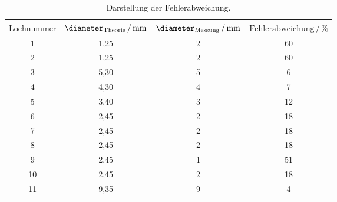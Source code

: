 \begin{table}[H]
  \centering
  \caption{Darstellung der Fehlerabweichung.}
  \label{tab:4}
  \begin{tabular}{c c c  c}
    \toprule
     $\text{Lochnummer}$ &
     $\diameter_{\text{Theorie}} \,/\, \si[per-mode=fraction]{\milli\meter}$ &
     $\diameter_{\text{Messung}} \,/\, \si[per-mode=fraction]{\milli\meter}$ &
     $\text{Fehlerabweichung} \,/\, \%$ \\
     \midrule
     1 & 1,25 & 2 &  60 \\
     2 & 1,25 & 2 &  60 \\
     3 & 5,30 & 5 &  6 \\
     4 & 4,30 & 4 &  7 \\
     5 & 3,40 & 3 &  12 \\
     6 & 2,45 & 2 &  18 \\
     7 & 2,45 & 2 &  18 \\
     8 & 2,45 & 2 &  18 \\
     9 & 2,45 & 1 &  51 \\
     10 & 2,45 & 2 & 18\\
     11 & 9,35  & 9 & 4 \\
     \bottomrule
  \end{tabular}
\end{table}

